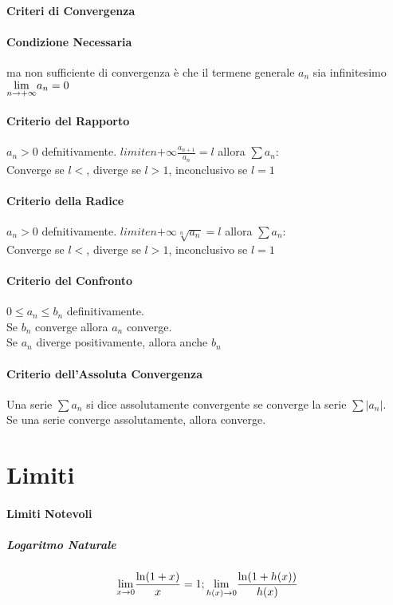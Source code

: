 \documentclass[12pt, a4paper, openany]{book}
\begin{document}
\paragraph*{Criteri di Convergenza}
\paragraph*{Condizione Necessaria} ma non sufficiente di convergenza è che il termene generale $a_n$ sia infinitesimo $\underset{n \to +\infty}{\lim} a_n = 0$

\paragraph*{Criterio del Rapporto}
$a_n>0$ defnitivamente. $limite{n}{+\infty} \frac{a_{n+1}}{a_n}=l$ allora $\sum a_n$:
\\Converge se $l<$, diverge se $l>1$, inconclusivo se $l=1$
\paragraph*{Criterio della Radice}
$a_n>0$ defnitivamente. $limite{n}{+\infty} \sqrt[n]{a_n}=l$ allora $\sum a_n$:
\\Converge se $l<$, diverge se $l>1$, inconclusivo se $l=1$
\paragraph*{Criterio del Confronto}
$0\leq a_n \leq b_n$  definitivamente.
\\Se $b_n$ converge allora $a_n$ converge.
\\Se $a_n$ diverge positivamente, allora anche $b_n$
\paragraph*{Criterio dell'Assoluta Convergenza}
Una serie $\sum a_n$ si dice assolutamente convergente se converge la serie $\sum |a_n|$.
\\Se una serie converge assolutamente, allora converge.

\section*{Limiti}
\paragraph*{Limiti Notevoli}

\subparagraph*{Logaritmo Naturale}
$$\underset{x \to 0}{\lim} \frac{\ln(1+x)}{x} = 1 ; \underset{h(x) \to 0}{\lim} \frac{\ln(1+h(x))}{h(x)}$$ 
\end{document}
